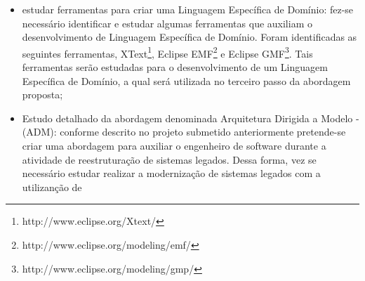 \begin{itemize}

\item estudar ferramentas para criar uma Linguagem Específica de Domínio: fez-se necessário identificar e estudar algumas ferramentas que auxiliam o desenvolvimento de Linguagem Específica de Domínio. Foram identificadas as seguintes ferramentas, XText\footnote{http://www.eclipse.org/Xtext/}, Eclipse EMF\footnote{http://www.eclipse.org/modeling/emf/} e Eclipse GMF\footnote{http://www.eclipse.org/modeling/gmp/}. Tais ferramentas serão estudadas para o desenvolvimento de um Linguagem Específica de Domínio, a qual será utilizada no terceiro passo da abordagem proposta;

\item Estudo detalhado da abordagem denominada Arquitetura Dirigida a Modelo - (ADM): conforme descrito no projeto submetido anteriormente pretende-se criar uma abordagem para auxiliar o engenheiro de software durante a atividade de reestruturação de sistemas legados. Dessa forma, vez se necessário estudar realizar a modernização de sistemas legados com a utilizanção de 

\end{itemize}
